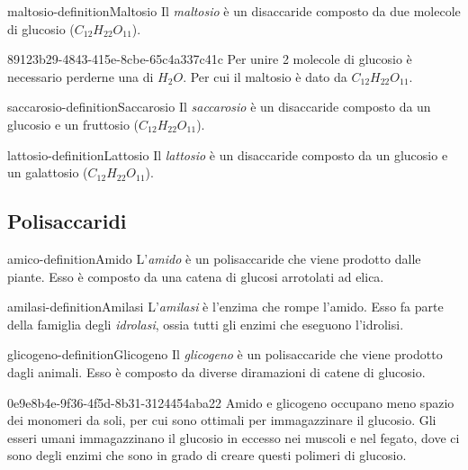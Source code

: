 \documentclass[preview]{standalone}
\begin{document}
\begin{snippetdefinition}{maltosio-definition}{Maltosio}
    Il \textit{maltosio} è un disaccaride composto da due molecole di glucosio (\(C_{12}H_{22}O_{11}\)).
\end{snippetdefinition}

\begin{snippet}{89123b29-4843-415e-8cbe-65c4a337c41c}
    Per unire 2 molecole di glucosio è necessario perderne una di \(H_2O\).
    Per cui il maltosio è dato da \(C_{12}H_{22}O_{11}\).
\end{snippet}

\begin{snippetdefinition}{saccarosio-definition}{Saccarosio}
    Il \textit{saccarosio} è un disaccaride composto da un glucosio e un fruttosio (\(C_{12}H_{22}O_{11}\)).
\end{snippetdefinition}

\begin{snippetdefinition}{lattosio-definition}{Lattosio}
    Il \textit{lattosio} è un disaccaride composto da un glucosio e un galattosio (\(C_{12}H_{22}O_{11}\)).
\end{snippetdefinition}

\subsection{Polisaccaridi}

\begin{snippetdefinition}{amico-definition}{Amido}
    L'\textit{amido} è un polisaccaride che viene prodotto dalle piante.
    Esso è composto da una catena di glucosi arrotolati ad elica.
\end{snippetdefinition}

\begin{snippetdefinition}{amilasi-definition}{Amilasi}
    L'\textit{amilasi} è l'enzima che rompe l'amido.
    Esso fa parte della famiglia degli \textit{idrolasi}, ossia tutti gli enzimi che
    eseguono l'idrolisi.
\end{snippetdefinition}

\begin{snippetdefinition}{glicogeno-definition}{Glicogeno}
    Il \textit{glicogeno} è un polisaccaride che viene prodotto dagli animali.
    Esso è composto da diverse diramazioni di catene di glucosio.
\end{snippetdefinition}

\begin{snippet}{0e9e8b4e-9f36-4f5d-8b31-3124454aba22}
    Amido e glicogeno occupano meno spazio dei monomeri da soli, per cui sono ottimali per immagazzinare
    il glucosio.
    Gli esseri umani immagazzinano il glucosio in eccesso nei muscoli e nel fegato, dove ci sono degli enzimi
    che sono in grado di creare questi polimeri di glucosio.
\end{snippet}
\end{document}
